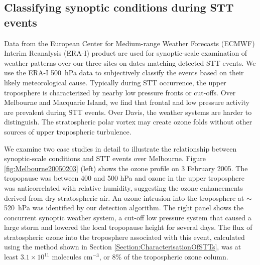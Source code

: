   \subsection{Classifying synoptic conditions during STT events}
  \label{Section:WeatherClassifications}
    Data from the European Center for Medium-range Weather Forecasts (ECMWF) Interim Reanalysis (ERA-I) \citep{Dee2011} product are used for synoptic-scale examination of weather patterns over our three sites on dates matching detected STT events.
    We use the ERA-I 500~hPa data to subjectively classify the events based on their likely meteorological cause.
    Typically during STT occurrence, the upper troposphere is characterized by nearby low pressure fronts or cut-offs.
    Over Melbourne and Macquarie Island, we find that frontal and low pressure activity are prevalent during STT events.
    Over Davis, the weather systems are harder to distinguish. The stratospheric polar vortex may create ozone folds without other sources of upper tropospheric turbulence.

    We examine two case studies in detail to illustrate the relationship between synoptic-scale conditions and STT events  over Melbourne.
    Figure \ref{fig:Melbourne20050203} (left) shows the ozone profile on 3 February 2005.
    The tropopause was between 400 and 500 hPa and ozone in the upper troposphere was anticorrelated with relative humidity, suggesting the ozone enhancements derived from dry stratospheric air. 
    An ozone intrusion into the troposphere at $\sim$520~hPa was identified by our detection algorithm.
    The right panel shows the concurrent synoptic weather system, a cut-off low pressure system that caused a large storm and lowered the local tropopause height for several days.
    The flux of stratospheric ozone into the troposphere associated with this event, calculated using the method shown in Section \ref{Section:CharacterisationOfSTTs}, was at least $3.1 \times 10^{11}$ molecules cm$^{-3}$, or 8\% of the tropospheric ozone column.

